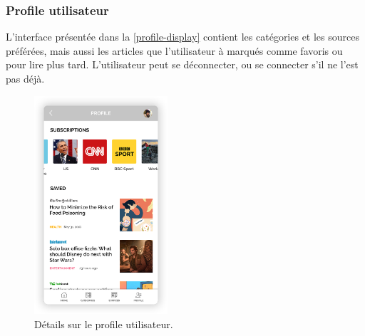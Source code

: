     \subsubsection{Profile utilisateur}
    L'interface présentée dans la \autoref{profile-display} contient les catégories et les sources préférées, mais aussi les articles que l'utilisateur à marqués comme favoris ou pour lire plus tard. L'utilisateur peut se déconnecter, ou se connecter s'il ne l'est pas déjà.
        \begin{figure}[H]
            \centering
            \includegraphics[width=140pt]{img/chapter4/feedny/en-profile.png}
            \caption{Détails sur le profile utilisateur.}
            \label{profile-display}
        \end{figure}

